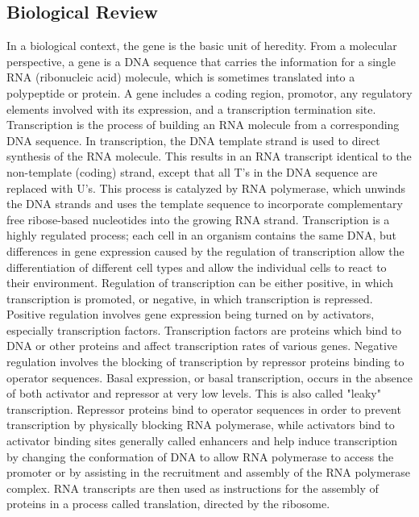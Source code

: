 \documentclass[paper=a4, fontsize=11pt]{scrartcl} %
\begin{document}
\subsection{Biological Review}
In a biological context, the gene is the basic unit of heredity. From a molecular perspective, a gene is a DNA sequence that carries the information for a single RNA (ribonucleic acid) molecule, which is sometimes translated into a polypeptide or protein. A gene includes a coding region, promotor, any regulatory elements involved with its expression, and a transcription termination site. Transcription is the process of building an RNA molecule from a corresponding DNA sequence. In transcription, the DNA template strand is used to direct synthesis of the RNA molecule. This results in an RNA transcript identical to the non-template (coding) strand, except that all T's in the DNA sequence are replaced with U's. This process is catalyzed by RNA polymerase, which unwinds the DNA strands and uses the template sequence to incorporate complementary free ribose-based nucleotides into the growing RNA strand. Transcription is a highly regulated process; each cell in an organism contains the same DNA, but differences in gene expression caused by the regulation of transcription allow the differentiation of different cell types and allow the individual cells to react to their environment. Regulation of transcription can be either positive, in which transcription is promoted, or negative, in which transcription is repressed. Positive regulation involves gene expression being turned on by activators, especially transcription factors. Transcription factors are proteins which bind to DNA or other proteins and affect transcription rates of various genes. Negative regulation involves the blocking of transcription by repressor proteins binding to operator sequences. Basal expression, or basal transcription, occurs in the absence of both activator and repressor at very low levels. This is also called "leaky" transcription. Repressor proteins bind to operator sequences in order to prevent transcription by physically blocking RNA polymerase, while activators bind to activator binding sites generally called enhancers and help induce transcription by changing the conformation of DNA to allow RNA polymerase to access the promoter or by assisting in the recruitment and assembly of the RNA polymerase complex. RNA transcripts are then used as instructions for the assembly of proteins in a process called translation, directed by the ribosome. 
\newline
\end{document}
